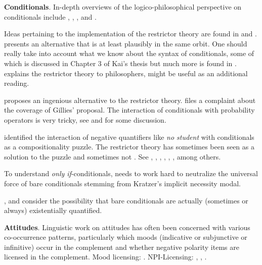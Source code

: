 \textbf{Conditionals}. In-depth overviews of the logico-philosophical
perspective on conditionals include \cite{nute-1984-conditional},
\cite{edgington-1995-conditionals}, \cite{bennett-2003-guide}, and
\cite{starr-2018-sep-counterfactuals}.

Ideas pertaining to the implementation of the restrictor theory are found in
\cite{reich-2009-asymmetric} and \cite{ebert-ebert-hinterwimmer-2014-unified}.
\cite{schlenker-2004-conditionals} presents an alternative that is at least
plausibly in the same orbit. One should really take into account what we know
about the syntax of conditionals, some of which is discussed in Chapter 3 of
Kai's thesis but much more is found in \cite{bhatt-pancheva-2006-conditionals}.
\cite{rothschild-2011-conditionals-restrictors} explains the restrictor theory
to philosophers, might be useful as an additional reading.

\cite{gillies-2010-iffiness} proposes an ingenious alternative to the restrictor
theory. \cite{khoo-2011-gillies} files a complaint about the coverage of
Gillies' proposal. The interaction of conditionals with probability operators is
very tricky, see \cite{egre-cozic-2011-if-prob} and
\cite{fintel-gillies-2015-hedging} for some discussion.

\cite{higginbotham-1986-davidson} identified the interaction of negative
quantifiers like \emph{no student} with conditionals as a compositionality
puzzle. The restrictor theory has sometimes been seen as a solution to the
puzzle \citep{fintel-1998-qandif} and sometimes not
\citep{fintel-iatridou-2002-ifwhen}. See \cite{dekker-2001-if-only},
\cite{higginbotham-2003-conditionals}, \cite{leslie-2009-unless},
\cite{huitink-2010-quantified-conditionals}, \cite{klinedinst-2011-qc-cem},
\cite{kratzer-2015-hook}, \cite{lauer-nadathur-2016-qic-most} among others.

To understand \emph{only if}-conditionals, \cite{fintel-1997-bare} needs to work
hard to neutralize the universal force of bare conditionals stemming from
Kratzer's implicit necessity modal.

\cite{herburger-2015-only-if,herburger-2016-perfection}, and
\cite{bassi-bar-lev-2017-unified-existential} consider the possibility that
bare conditionals are actually (sometimes or always) existentially quantified.

\textbf{Attitudes}. Linguistic work on attitudes has often been concerned with
various co-occurrence patterns, particularly which moods (indicative or
subjunctive or infinitive) occur in the complement and whether negative polarity
items are licensed in the complement. Mood licensing: \cite{portner-1997-mood}.
NPI-Licensing: \cite{kadmon-landman-1993-any}, \cite{fintel-1999-npi},
\cite{giannakidou-1999-affective}.

